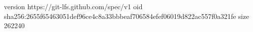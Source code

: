 version https://git-lfs.github.com/spec/v1
oid sha256:2655f65463051def96ce4c8a33bbbeaf706584efef06019d822ac557f0a321fe
size 262240
